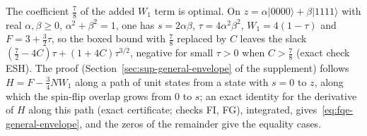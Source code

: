 The coefficient $\frac78$ of the added $W_1$ term is optimal. On $z=\alpha|0000\rangle+\beta|1111\rangle$ with real
$\alpha,\beta\ge0$, $\alpha^2+\beta^2=1$, one has $s=2\alpha\beta$, $\tau=4\alpha^2\beta^2$, $W_1=4(1-\tau)$ and $F=3+\frac32\tau$, so the boxed bound with $\frac78$ replaced by $C$ leaves the slack
$(\frac72-4C)\tau+(1+4C)\tau^{3/2}$, negative for small $\tau>0$ when $C>\frac78$ (exact check ESH). The proof (Section~\ref{sec:sup-general-envelope} of the supplement) follows $H=F-\frac34NW_1$ along a path of unit states
from a state with $s=0$ to $z$, along which the spin-flip overlap grows from $0$ to $s$; an exact identity for the
derivative of $H$ along this path (exact certificate; checks FI, FG), integrated, gives~\eqref{eq:fqe-general-envelope}, and the zeros of the
remainder give the equality cases.
